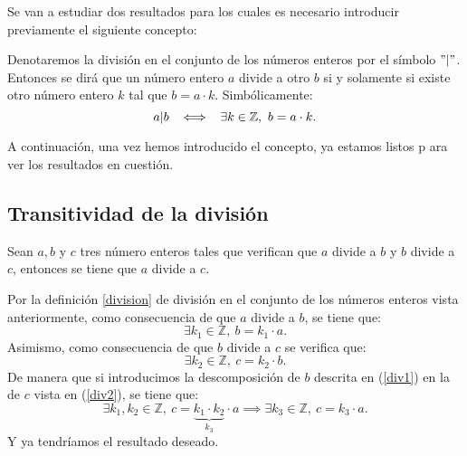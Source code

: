 Se van a estudiar dos resultados para los cuales es necesario 
introducir previamente el siguiente concepto:
\begin{definicion}\label{division}
	Denotaremos la división en el conjunto de los números enteros por el símbolo
	 \( "|" \). Entonces se dirá que un número entero \(a\) divide a otro \(b\)
	  si y solamente si existe otro número entero \(k\) tal que \(b=a\cdot k\).
	  Simbólicamente:
	  \begin{equation}
	  a|b \hspace{0.2cm} \iff \hspace{0.2cm} \exists k \in \mathbb{Z}, \ b=a\cdot k.
	  \end{equation}
\end{definicion}

A continuación, una vez hemos introducido el concepto, ya estamos listos p
ara ver los resultados en cuestión.

\subsection{Transitividad de la división}
\begin{teorema}
	Sean \(a, b\) y \(c\) tres número enteros tales que verifican 
	que \(a\) divide a \(b\) y \(b\) divide a \(c\), 
	entonces se tiene que \(a\) divide a \(c\).
\end{teorema}
\begin{demostracion}
	Por la definición \ref{division} de división en el conjunto 
	de los números enteros vista anteriormente, como 
	consecuencia de que \(a\) divide a \(b\), se tiene que:
	\begin{equation}\label{div1}
	\exists k_1 \in \mathbb{Z}, \ b=k_1 \cdot a.
	\end{equation}
	Asimismo, como consecuencia de que \(b\) divide a \(c\) se 
	verifica que:
	\begin{equation}\label{div2}
	\exists k_2 \in \mathbb{Z}, \ c=k_2 \cdot b.
	\end{equation}
	De manera que si introducimos la descomposición de \(b\) descrita 
	en (\ref{div1}) en la de \(c\) vista en (\ref{div2}), se tiene que:
	\begin{equation}
	\exists k_1, k_2 \in \mathbb{Z}, \ c=\underbrace{k_1 \cdot k_2}_{k_3} \cdot a 
	\implies \exists k_3\in \mathbb{Z}, \ c=k_3 \cdot a .
	\end{equation}
	Y ya tendríamos el resultado deseado.
\end{demostracion}

